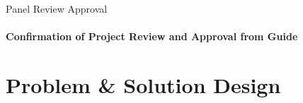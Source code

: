 \documentclass[aspectratio=169, 11pt]{beamer}
\begin{document}
\begin{frame}{Panel Review Approval}
    \framesubtitle{Confirmation of Project Review and Approval from Guide}
    \centering
    \vspace{1.0cm}
\end{frame}

\section{Problem \& Solution Design}
\end{document}
